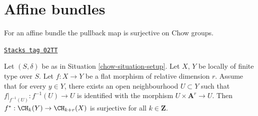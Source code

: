\section{Affine bundles}
\label{chow-section-affine-vector}
For an affine bundle the pullback map is surjective on Chow groups.

\begin{lemma}
\label{chow-lemma-pullback-affine-fibres-surjective}
\href{https://stacks.math.columbia.edu/tag/02TT}{\texttt{Stacks tag 02TT}}

Let $(S, \delta)$ be as in Situation \ref{chow-situation-setup}.
Let $X$, $Y$ be locally of finite type over $S$.
Let $f : X \to Y$ be a flat morphism of relative dimension $r$.
Assume that for every $y \in Y$, there exists an open neighbourhood
$U \subset Y$ such that $f|_{f^{-1}(U)} : f^{-1}(U) \to U$
is identified with the morphism $U \times \mathbf{A}^r \to U$.
Then $f^* : \CH_k(Y) \to \CH_{k + r}(X)$ is surjective for all
$k \in \mathbf{Z}$.
\end{lemma}

